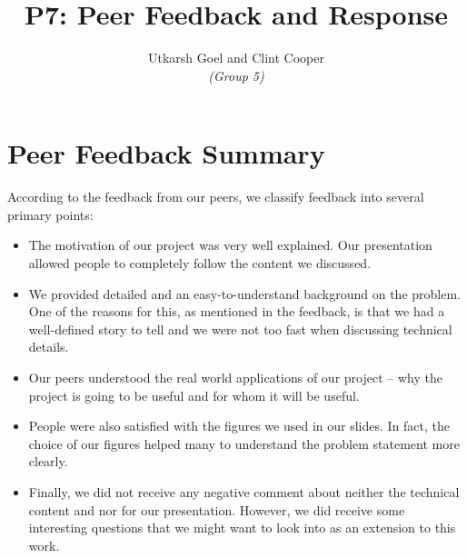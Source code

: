 \documentclass{article}
\title{P7: Peer Feedback and Response}
\author{Utkarsh Goel and Clint Cooper\\ \large \textit{(Group 5)}}
\date{}
\begin{document}
\maketitle

\section{Peer Feedback Summary}
According to the feedback from our peers, we classify feedback into several primary points: 
\begin{itemize}
    \item The motivation of our project was very well explained. 
    Our presentation allowed people to completely follow the content we discussed.
    \item We provided detailed and an easy-to-understand background on the problem.
    One of the reasons for this, as mentioned in the feedback, is that we had a well-defined story to tell and we were not too fast when discussing technical details.
    \item Our peers understood the real world applications of our project -- why the project is going to be useful and for whom it will be useful.
    \item People were also satisfied with the figures we used in our slides. In fact, the choice of our figures helped many to understand the problem statement more clearly.
    \item Finally, we did not receive any negative comment about neither the technical content and nor for our presentation.
    However, we did receive some interesting questions that we might want to look into as an extension to this work.
\end{itemize}
\end{document}
